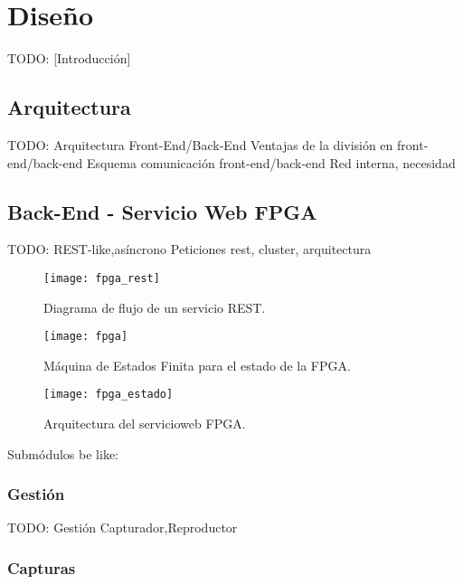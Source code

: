 \chapter{Diseño\label{cap:disenho}}

TODO: [Introducción]


\section{Arquitectura\label{sec:dis:arquitectura}}

TODO: Arquitectura
  {Front-End/Back-End}
  Ventajas de la división en front-end/back-end
  Esquema comunicación front-end/back-end
  Red interna, necesidad

\section{Back-End - Servicio Web FPGA\label{sec:dis:servicio_web_fpga}}

TODO: 
  {REST-like,asíncrono}
  Peticiones rest, cluster, arquitectura

\begin{figure}[!htp]
  \centering
  \texttt{[image: fpga\_rest]}
  \caption{Diagrama de flujo de un servicio \gls{REST}.}
  \label{fig:fpga_rest}
\end{figure}

\begin{figure}[!htp]
  \centering
  \texttt{[image: fpga]}
  \caption{Máquina de Estados Finita para el estado de la \gls{FPGA}.}
  \label{fig:arquitectura_servicio}
\end{figure}

\begin{figure}[!htp]
  \centering
  \texttt{[image: fpga\_estado]}
  \caption{Arquitectura del \gls{servicioweb} \gls{FPGA}.}
  \label{fig:fpga_estado}
\end{figure}

Submódulos be like:

\subsection{Gestión\label{ssec:dis:gestion}}

TODO: Gestión
  {Capturador,Reproductor}


\subsection{Capturas\label{ssec:dis:capturas}}

